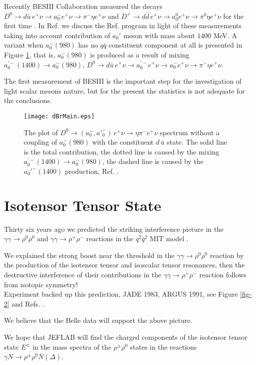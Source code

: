 \documentclass[aps,preprint,groupedaddress,floatfix]{revtex4}
\begin{document}
Recently BESIII Collaboration measured the decays $D^0\to d\bar
u\, e^+\nu\to a_0^-e^+\nu\to\pi^-\eta e^+\nu$ and $D^+\to d\bar
d\, e^+\nu\to a_0^0 e^+\nu\to\pi^0\eta e^+\nu$ for the first time
\cite{besIII}. In Ref. \cite{NNA+AVK} we discuss the Ref.
\cite{dsdecay} program in light of these measurements taking into
account contribution of $a_0'$ meson with mass about $1400$ MeV. A
variant when $a_0^-(980)$ has no $q\bar q$ constituent component
at all is presented in Figure \ref{fig-1}, that is, $a_0^-(980)$
is produced as a result of mixing $a_0^{\prime-}(1400)\to
a_0^-(980)$,
 $D^0\to d\bar u\, e^+\nu\to a_0^{\prime -}e^+\nu \to a_0^-e^+\nu\to \pi^-\eta e^+\nu$.

The first measurement of BESIII is the important step for the
investigation of light scalar mesons nature, but for the present
the statistics is not adequate for the conclusions.

\begin{figure}[h]
\centering
\texttt{[image: dBrMain.eps]}
\caption{The plot of $D^0\to (a^-_0,a'^-_0)\, e^+\nu\to\eta\pi^-
e^+\nu$ spectrum without a coupling of $a_0^-(980)$ with the
constituent $d\,\bar{u} $ state. The solid line is the total
contribution, the dotted line is caused by
 the mixing $a_0^{\prime-}(1400)\to
a_0^-(980)$, the dashed line is  caused by the $a_0'^-(1400)$
production, Ref. \cite{NNA+AVK}.} \label{fig-1}
\end{figure}
\section{Isotensor Tensor \bf{} State}
\label{sec-2}
 Thirty six years ago we predicted \cite{fourQuarkGG} the striking
interference picture in the  $\gamma\gamma\to\rho^0\rho^0$ and
$\gamma\gamma\to\rho^+\rho^-$ reactions  in the $q^2\bar q^2$ MIT
model \cite{jaffe}.

We explained the strong boost near the threshold in the
$\gamma\gamma\to\rho^0\rho^0$ reaction by the production of the
isotensor tensor and isoscalar tensor resonances,  then the
destructive interference of their contributions in the
$\gamma\gamma\to\rho^+\rho^-$ reaction follows from isotopic
symmetry!\\[3pt]
 Experiment backed up this prediction, JADE 1983, ARGUS 1991,
 see Figure \ref{fig-2} and Refs. \cite{I=21985, I=21991}.

We believe that the Belle data will support the above picture.

 We
\cite{I=21999} hope that JEFLAB will find the charged components
of the isotensor tensor state $E^{\pm}$ in the mass spectra of the
$\rho^{\pm}\rho^0$ states in the reactions $\gamma
N\to\rho^{\pm}\rho^0 N(\Delta)$.
\end{document}
